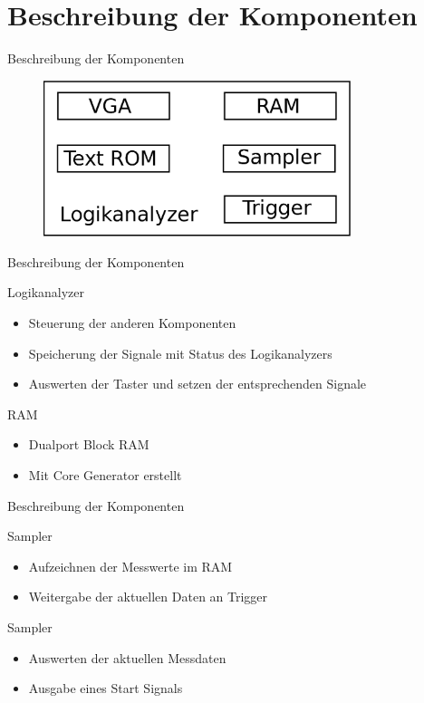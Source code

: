\section{Beschreibung der Komponenten}
\begin{frame}[<+->]{Beschreibung der Komponenten}
    \begin{figure}
        \centerline{
            \includegraphics[width=0.8\textwidth]{abbildungen/komponenten}
        }
    \end{figure}
\end{frame}
\begin{frame}[<+->]{Beschreibung der Komponenten}
    \begin{block}{Logikanalyzer}
        \begin{itemize}
            \item Steuerung der anderen Komponenten
            \item Speicherung der Signale mit Status des Logikanalyzers
            \item Auswerten der Taster und setzen der entsprechenden Signale
        \end{itemize}
    \end{block}
    \begin{block}{RAM}
        \begin{itemize}
            \item Dualport Block RAM
            \item Mit Core Generator erstellt
        \end{itemize}
    \end{block}
\end{frame}
\begin{frame}[<+->]{Beschreibung der Komponenten}
    \begin{block}{Sampler}
        \begin{itemize}
            \item Aufzeichnen der Messwerte im RAM
            \item Weitergabe der aktuellen Daten an Trigger
        \end{itemize}
    \end{block}
    \begin{block}{Sampler}
        \begin{itemize}
            \item Auswerten der aktuellen Messdaten
            \item Ausgabe eines Start Signals
        \end{itemize}
    \end{block}
\end{frame}
